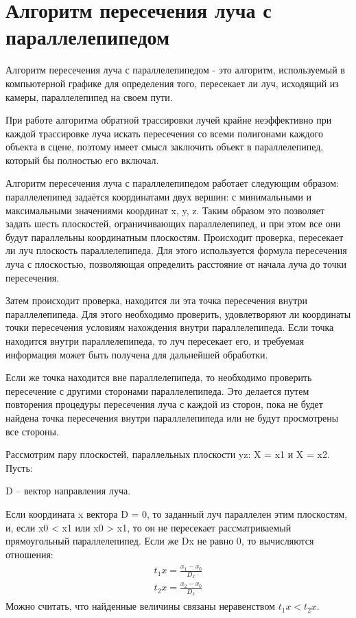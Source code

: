 \section{Алгоритм пересечения луча с параллелепипедом}

Алгоритм пересечения луча с параллелепипедом - это алгоритм, используемый в компьютерной графике для определения того, пересекает ли луч, исходящий из камеры, параллелепипед на своем пути.


При работе алгоритма обратной трассировки лучей крайне неэффективно при каждой трассировке луча искать пересечения со всеми полигонами каждого объекта в сцене, поэтому имеет смысл заключить объект в параллелепипед, который бы полностью его включал.


Алгоритм пересечения луча с параллелепипедом работает следующим образом: параллелепипед задаётся координатами двух вершин: с минимальными и максимальными значениями координат x, y, z. Таким образом это позволяет задать шесть плоскостей, ограничивающих параллелепипед, и при этом все они будут параллельны координатным плоскостям. Происходит проверка, пересекает ли луч плоскость параллелепипеда. Для этого используется формула пересечения луча с плоскостью, позволяющая определить расстояние от начала луча до точки пересечения.


Затем происходит проверка, находится ли эта точка пересечения внутри параллелепипеда. Для этого необходимо проверить, удовлетворяют ли координаты точки пересечения условиям нахождения внутри параллелепипеда. Если точка находится внутри параллелепипеда, то луч пересекает его, и требуемая информация может быть получена для дальнейшей обработки.


Если же точка находится вне параллелепипеда, то необходимо проверить пересечение с другими сторонами параллелепипеда. Это делается путем повторения процедуры пересечения луча с каждой из сторон, пока не будет найдена точка пересечения внутри параллелепипеда или не будут просмотрены все стороны.

\newpage
Рассмотрим пару плоскостей, параллельных плоскости yz: X = x1 и X = x2. Пусть:


D – вектор направления луча. 


Если координата x вектора D = 0, то заданный луч параллелен этим плоскостям, и, если x0 < x1 или x0 > x1, то он не пересекает рассматриваемый прямоугольный параллелепипед. Если же Dx не равно 0, то вычисляются отношения:
\begin{align}
	\begin{gathered}
	t_1x = \frac{x_1 - x_0}{D_x}\\
	t_2x = \frac{x_2 - x_0}{D_x}
	\end{gathered}
\end{align}
Можно считать, что найденные величины связаны неравенством $t_1x < t_2x$.


